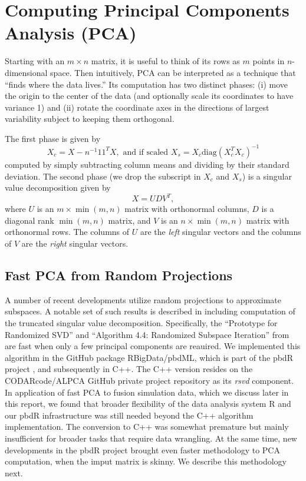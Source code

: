 \section{Computing Principal Components Analysis (PCA)}
\label{sec:pca}
Starting with an $m\times n$ matrix, it is useful to think of its rows
as $m$ points in $n$-dimensional space. Then intuitively, PCA can be
interpreted as a technique that ``finds where the data lives.''
Its computation has two distinct phases: (i) move the origin to the
center of the data (and optionally scale its coordinates to have
variance 1) and (ii) rotate the coordinate axes in the directions of
largest variability subject to keeping them orthogonal.

The first phase is given by
\begin{displaymath}
  X_c = X - n^{-1}11^TX, \mbox{ and if scaled }
  X_s = X_c \mbox{diag}(X_c^TX_c)^{-1}
\end{displaymath}
computed by simply subtracting column means and dividing by their
standard deviation. The second phase (we drop the subscript in $X_c$
and $X_s$) is a singular value decomposition given by
\begin{equation}
  X = U D V^T,
  \label{eq:svd}
\end{equation}
where $U$ is an $m \times \min(m,n)$ matrix with orthonormal columns,
$D$ is a diagonal rank $\min(m,n)$ matrix, and $V$ is an
$n\times\min(m,n)$ matrix with orthonormal rows. The columns of $U$
are the {\it left} singular vectors and the columns of $V$ are the
{\it right} singular vectors.

\subsection{Fast PCA from Random Projections}

A number of recent developments utilize random projections to
approximate subspaces. A notable set of such results is described in
\cite{Halko2011} including computation of the truncated singular value
decomposition. Specifically, the ``Prototype for Randomized SVD'' and
``Algorithm 4.4: Randomized Subspace Iteration'' from \cite{Halko2011}
are fast when only a few principal components are reauired. We
implemented this algorithm in the GitHub package RBigData/pbdML, which
is part of the pbdR project \cite{Schmidt2017}, and subsequently in
C++. The C++ version resides on the CODARcode/ALPCA GitHub private
project repository as its {\it rsvd} component. In application of fast
PCA to fusion simulation data, which we discuss later in this report,
we found that broader flexibility of the data analysis system R and
our pbdR infrastructure was still needed beyond the C++ algorithm
implementation. The conversion to C++ was somewhat premature but
mainly insufficient for broader tasks that require data wrangling. At
the same time, new developments in the pbdR project brought even
faster methodology to PCA computation, when the imput matrix is
skinny. We describe this methodology next.


